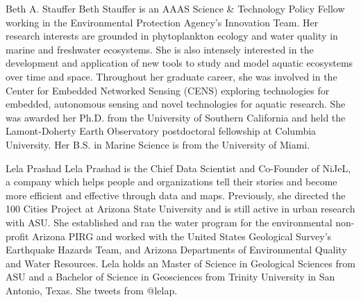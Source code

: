 Beth A. Stauffer
Beth Stauffer is an AAAS Science & Technology Policy Fellow working in
the Environmental Protection Agency's Innovation Team.
Her research interests are grounded in phytoplankton ecology and water
quality in marine and freshwater ecosystems. She is also intensely interested
in the development and application of new tools to study and model
aquatic ecosystems over time and space.
Throughout her graduate career, she was involved in the Center for Embedded
Networked Sensing (CENS) exploring technologies for embedded,
autonomous sensing and novel technologies for aquatic research.
She was awarded her Ph.D. from the University of Southern California
and held the Lamont-Doherty Earth Observatory postdoctoral fellowship
at Columbia University. Her B.S. in Marine Science is from the University
of Miami.


Lela Prashad
Lela Prashad is the Chief Data Scientist and Co-Founder of NiJeL, a company
which helps people and organizations tell their stories and become
more efficient and effective through data and maps.
Previously, she directed the 100 Cities Project at Arizona State University
and is still active in urban research with ASU. She established and ran the
water program for the environmental non-profit Arizona PIRG and worked
with the United States Geological Survey's Earthquake Hazards Team, and
Arizona Departments of Environmental Quality and Water Resources.
Lela holds an Master of Science in Geological Sciences from ASU and
a Bachelor of Science in Geosciences from Trinity University in San
Antonio, Texas.
She tweets from @lelap.



